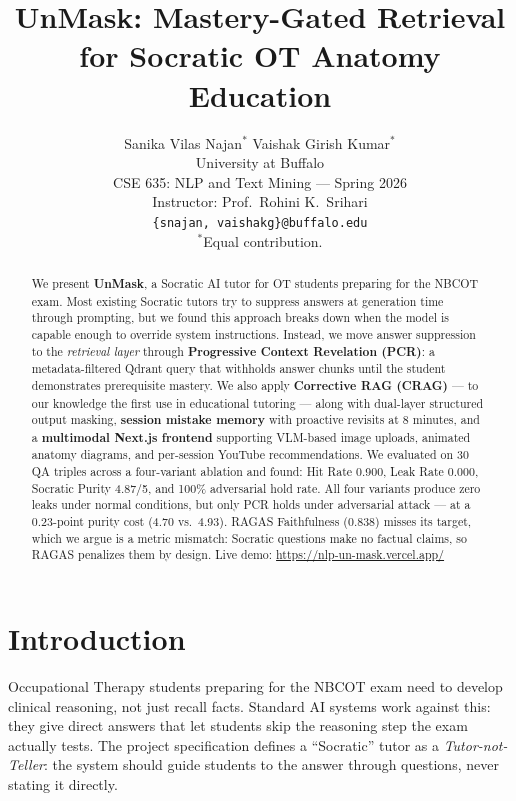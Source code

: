 \documentclass[11pt]{article}
\title{UnMask: Mastery-Gated Retrieval for Socratic OT Anatomy Education}
\author{Sanika Vilas Najan$^*$ \quad Vaishak Girish Kumar$^*$ \\
  University at Buffalo \\
  CSE 635: NLP and Text Mining --- Spring 2026 \\
  Instructor: Prof.\ Rohini K.\ Srihari \\
  \texttt{\{snajan, vaishakg\}@buffalo.edu} \\[2pt]
  \small $^*$Equal contribution.}
\begin{document}
\maketitle

\begin{abstract}
We present \textbf{UnMask}, a Socratic AI tutor for OT students preparing for the NBCOT exam.
Most existing Socratic tutors try to suppress answers at generation time through prompting,
but we found this approach breaks down when the model is capable enough to override
system instructions.
Instead, we move answer suppression to the \emph{retrieval layer} through
\textbf{Progressive Context Revelation (PCR)}: a metadata-filtered Qdrant query that
withholds answer chunks until the student demonstrates prerequisite mastery.
We also apply \textbf{Corrective RAG (CRAG)} --- to our knowledge the first use in
educational tutoring --- along with dual-layer structured output masking,
\textbf{session mistake memory} with proactive revisits at 8 minutes,
and a \textbf{multimodal Next.js frontend} supporting VLM-based image uploads, animated anatomy
diagrams, and per-session YouTube recommendations.
We evaluated on 30 QA triples across a four-variant ablation and found:
Hit Rate 0.900, Leak Rate 0.000, Socratic Purity 4.87/5, and 100\% adversarial hold rate.
All four variants produce zero leaks under normal conditions, but only PCR
holds under adversarial attack --- at a 0.23-point purity cost (4.70 vs.\ 4.93).
RAGAS Faithfulness (0.838) misses its target, which we argue is a metric mismatch:
Socratic questions make no factual claims, so RAGAS penalizes them by design.
Live demo: \url{https://nlp-un-mask.vercel.app/}
\end{abstract}

\section{Introduction}

Occupational Therapy students preparing for the NBCOT exam need to develop clinical
reasoning, not just recall facts.
Standard AI systems work against this: they give direct answers that let students
skip the reasoning step the exam actually tests.
The project specification defines a ``Socratic'' tutor as a \emph{Tutor-not-Teller}:
the system should guide students to the answer through questions, never stating it directly.
\end{document}
